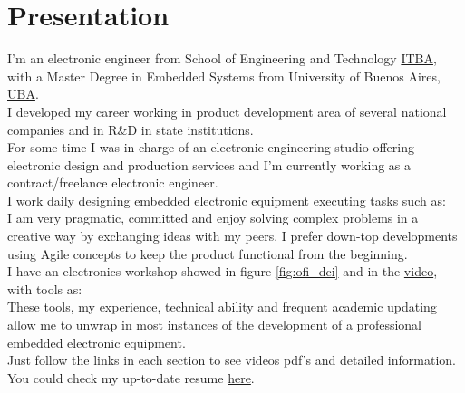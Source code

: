 \section{Presentation}

I'm an electronic engineer from School of Engineering and Technology \href{\linkitba}{ITBA},
with a Master Degree in Embedded Systems from University of Buenos Aires, \href{\linkuba}{UBA}.\\
I developed my career working in product development area of several
national companies and in R\&D in state institutions.\\
For some time I was in charge of an electronic engineering studio offering electronic design
and production services and I'm currently working as a contract/freelance electronic engineer.\\ %
I work daily designing embedded electronic equipment executing tasks such as: \\
I am very pragmatic, committed and enjoy solving complex problems in a creative way by exchanging ideas
with my peers. I prefer down-top developments using Agile concepts to keep the product functional from
the beginning.\\
I have an electronics workshop showed in figure \ref{fig:ofi_dci} and in the \href{\linkofidci}{video}, with tools as:\\
These tools, my experience, technical ability and frequent academic updating allow me to unwrap
in most instances of the development of a professional embedded electronic equipment.\\
Just follow the links in each section to see videos pdf's and detailed information.\\
You could check my up-to-date resume \href{\linkgithubcvpdf}{here}.\\


